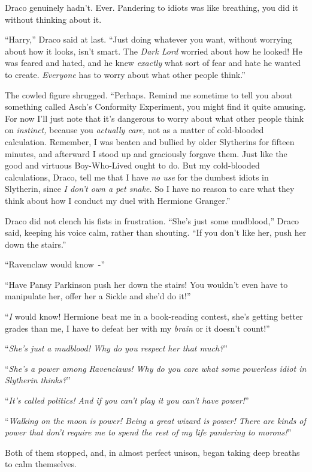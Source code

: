 Draco genuinely hadn't. Ever. Pandering to idiots was like breathing, you did it without thinking about it.

``Harry,'' Draco said at last. ``Just doing whatever you want, without worrying about how it looks, isn't smart. The \emph{Dark Lord} worried about how he looked! He was feared and hated, and he knew \emph{exactly} what sort of fear and hate he wanted to create. \emph{Everyone} has to worry about what other people think.''

The cowled figure shrugged. ``Perhaps. Remind me sometime to tell you about something called Asch's Conformity Experiment, you might find it quite amusing. For now I'll just note that it's dangerous to worry about what other people think on \emph{instinct,} because you \emph{actually care,} not as a matter of cold-blooded calculation. Remember, I was beaten and bullied by older Slytherins for fifteen minutes, and afterward I stood up and graciously forgave them. Just like the good and virtuous Boy-Who-Lived ought to do. But my cold-blooded calculations, Draco, tell me that I have \emph{no use} for the dumbest idiots in Slytherin, since \emph{I don't own a pet snake.} So I have no reason to care what they think about how I conduct my duel with Hermione Granger.''

Draco did not clench his fists in frustration. ``She's just some mudblood,'' Draco said, keeping his voice calm, rather than shouting. ``If you don't like her, push her down the stairs.''

``Ravenclaw would know~-''

``Have Pansy Parkinson push her down the stairs! You wouldn't even have to manipulate her, offer her a Sickle and she'd do it!''

``\emph{I} would know! Hermione beat me in a book-reading contest, she's getting better grades than me, I have to defeat her with my \emph{brain} or it doesn't count!''

``\emph{She's just a mudblood! Why do you respect her that much?}''

``\emph{She's a power among Ravenclaws! Why do you care what some powerless idiot in Slytherin thinks?}''

``\emph{It's called politics! And if you can't play it you can't have power!}''

``\emph{Walking on the moon is power! Being a great wizard is power! There are kinds of power that don't require me to spend the rest of my life pandering to morons!}''

Both of them stopped, and, in almost perfect unison, began taking deep breaths to calm themselves.

